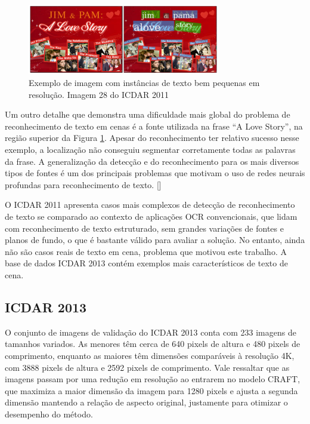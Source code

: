 \begin{figure}
    \centering
    \includegraphics[width=0.75\textwidth]{figs/resultados-icdar11-03.png}
    \caption{Exemplo de imagem com instâncias de texto bem pequenas em resolução. Imagem 28 do ICDAR 2011}
    \label{fig:results_icdar11_03}
\end{figure}

Um outro detalhe que demonstra uma dificuldade mais global do problema de reconhecimento de texto em cenas é a fonte utilizada na frase “A Love Story”, na região superior da Figura \ref{fig:results_icdar11_03}. Apesar do reconhecimento ter relativo sucesso nesse exemplo, a localização não conseguiu segmentar corretamente todas as palavras da frase. A generalização da detecção e do reconhecimento para os mais diversos tipos de fontes é um dos principais problemas que motivam o uso de redes neurais profundas para reconhecimento de texto. []

O ICDAR 2011 apresenta casos mais complexos de detecção de reconhecimento de texto se comparado ao contexto de aplicações OCR convencionais, que lidam com reconhecimento de texto estruturado, sem grandes variações de fontes e planos de fundo, o que é bastante válido para avaliar a solução. No entanto, ainda não são casos reais de texto em cena, problema que motivou este trabalho. A base de dados ICDAR 2013 contém exemplos mais característicos de texto de cena.


\subsection{ICDAR 2013}\label{sec:results_icdar_2013}

O conjunto de imagens de validação do ICDAR 2013 conta com 233 imagens de tamanhos variados. As menores têm cerca de 640 pixels de altura e 480 pixels de comprimento, enquanto as maiores têm dimensões comparáveis à resolução 4K, com 3888 pixels de altura e 2592 pixels de comprimento. Vale ressaltar que as imagens passam por uma redução em resolução ao entrarem no modelo CRAFT, que maximiza a maior dimensão da imagem para 1280 pixels e ajusta a segunda dimensão mantendo a relação de aspecto original, justamente para otimizar o desempenho do método.

